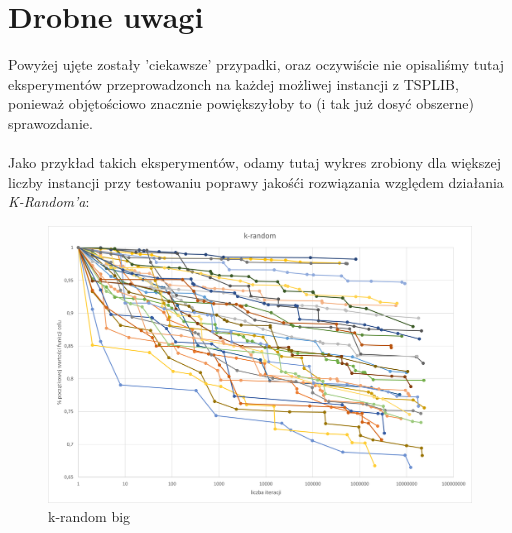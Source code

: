 \documentclass{article}
\begin{document}
\section*{Drobne uwagi}
Powyżej ujęte zostały 'ciekawsze' przypadki, oraz oczywiście nie opisaliśmy tutaj eksperymentów przeprowadzonch na każdej możliwej instancji z TSPLIB, ponieważ objętościowo znacznie powiększyłoby to (i tak już dosyć obszerne) sprawozdanie.\\
\\
Jako przykład takich eksperymentów, odamy tutaj wykres zrobiony dla większej liczby instancji przy testowaniu poprawy jakośći rozwiązania względem działania \textit{K-Random'a}:
\begin{figure}[H]
\includegraphics[scale=0.7]{k-randomFull.png}
\caption{k-random big}
\end{figure}
\end{document}
